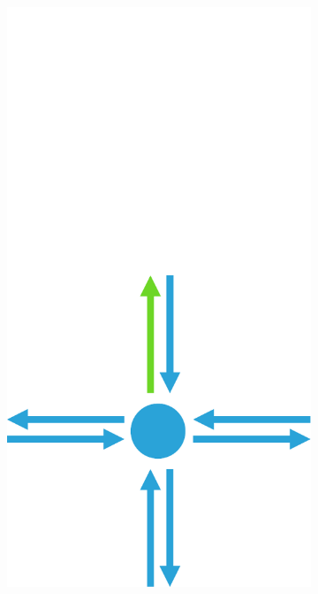 \documentclass[12pt]{article}
\begin{document}
\begin{figure}[tb]
  \centering
  \vspace{-10 mm}

  \begin{subfigure}[b]{0.15\textwidth}
      \includegraphics[width=\textwidth]{img/1}
      \caption{}\label{fig:contraction_kernel_greedy1}
  \end{subfigure}~%

\end{figure}
\end{document}
